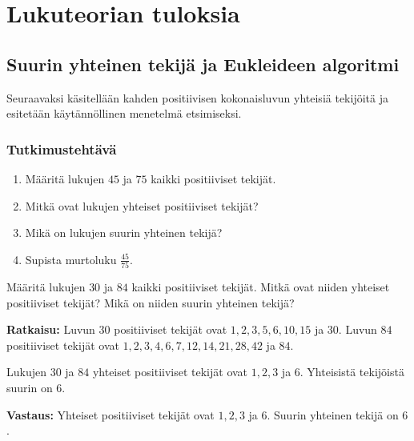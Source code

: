 \chapter{Lukuteorian tuloksia}


\section{Suurin yhteinen tekijä ja Eukleideen algoritmi}
Seuraavaksi käsitellään kahden positiivisen kokonaisluvun yhteisiä tekijöitä ja esitetään käytännöllinen menetelmä  etsimiseksi.

\subsection*{Tutkimustehtävä}
\begin{enumerate}
\item Määritä lukujen $45$ ja $75$ kaikki positiiviset tekijät.
\item Mitkä ovat lukujen yhteiset positiiviset tekijät?
\item Mikä on lukujen suurin yhteinen tekijä?
\item Supista murtoluku $\frac{45}{75}$.
\end{enumerate}

\begin{esimerkki}
Määritä lukujen $30$ ja $84$ kaikki positiiviset tekijät. Mitkä ovat niiden yhteiset positiiviset tekijät? Mikä on niiden suurin yhteinen tekijä?

{\bf Ratkaisu:} Luvun $30$ positiiviset tekijät ovat $1, 2, 3, 5, 6, 10, 15$ ja $30$. Luvun $84$ positiiviset tekijät ovat $1, 2, 3, 4, 6, 7, 12, 14, 21, 28, 42$ ja $84$.

Lukujen $30$ ja $84$ yhteiset positiiviset tekijät ovat $1, 2, 3$ ja $6$. Yhteisistä tekijöistä suurin on $6$.

{\bf Vastaus:} 
Yhteiset positiiviset tekijät ovat $1, 2, 3$ ja $6$. Suurin yhteinen tekijä on $6$.
\end{esimerkki}


